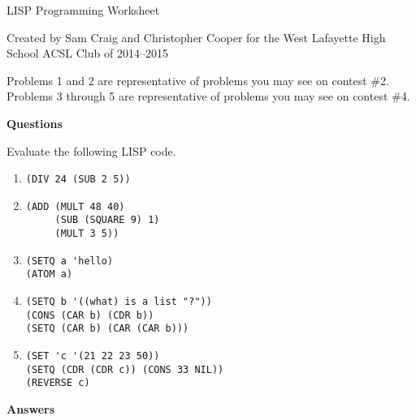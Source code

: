 \documentclass[12pt,letterpaper]{article}
\begin{document}
\begin{center}
  LISP Programming Worksheet

  Created by Sam Craig and Christopher Cooper for the West Lafayette High School ACSL Club of 2014--2015
\end{center}

Problems 1 and 2 are representative of problems you may see on contest \#2.
Problems 3 through 5 are representative of problems you may see on contest \#4.

\bigskip
\noindent \textbf{Questions}

Evaluate the following LISP code.

\begin{enumerate}

\item
\begin{verbatim}
(DIV 24 (SUB 2 5))
\end{verbatim}

\item
\begin{verbatim}
(ADD (MULT 48 40)
     (SUB (SQUARE 9) 1)
     (MULT 3 5))
\end{verbatim}

\item
\begin{verbatim}
(SETQ a 'hello)
(ATOM a)
\end{verbatim}

\item
\begin{verbatim}
(SETQ b '((what) is a list "?"))
(CONS (CAR b) (CDR b))
(SETQ (CAR b) (CAR (CAR b)))
\end{verbatim}

\item
\begin{verbatim}
(SET 'c '(21 22 23 50))
(SETQ (CDR (CDR c)) (CONS 33 NIL))
(REVERSE c)
\end{verbatim}

\end{enumerate}

\pagebreak

\noindent \textbf{Answers}
\end{document}
